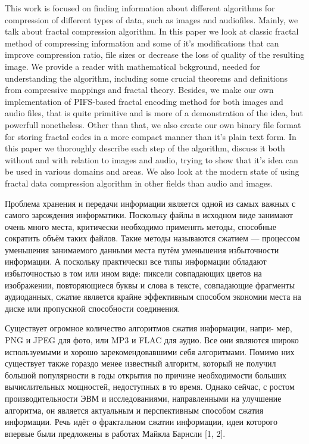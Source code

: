\documentclass[bachelor,paper]{pmk-graduate}
\theoremstyle{definition}
\begin{document}
\begin{englishabstract}
This work is focused on finding information about different algorithms for compression of different types of data, such as images and audiofiles. Mainly, we talk about fractal compression algorithm. In this paper we look at classic fractal method of compressing information and some of it's modifications that can improve compression ratio, file sizes or decrease the loss of quality of the resulting image. We provide a reader with mathematical bckground, needed for understanding the algorithm, including some crucial theorems and definitions from compressive mappings and fractal theory.
  Besides, we make our own implementation of PIFS-based fractal encoding method for both images and audio files, that is quite primitive and is more of a demonstration of the idea, but powerfull nonetheless. Other than that, we also create our own binary file format for storing fractal codes in a more compact manner than it's plain text form.
  In this paper we thoroughly describe each step of the algorithm, discuss it both without and with relation to images and audio, trying to show that it's idea can be used in various domains and areas. We also look at the modern state of using fractal data compression algorithm in other fields than audio and images.
\end{englishabstract}

\renewcommand{\thealgorithm}{\arabic{algorithm}.}

\maketitlepage
\introduction
\actuality
Проблема хранения и передачи информации является одной из самых важных с самого зарождения информатики. Поскольку файлы в исходном виде занимают очень много места, критически необходимо применять методы, способные сократить объём таких файлов. Такие методы называются сжатием --- процессом уменьшения занимаемого данными места путём уменьшения избыточности информации. А поскольку практически все типы информации обладают избыточностью в том или ином виде: пиксели совпадающих цветов на изображении, повторяющиеся буквы и слова в тексте, совпадающие фрагменты аудиоданных, сжатие является крайне эффективным способом экономии места на диске или пропускной способности соединения.

Существует огромное количество алгоритмов сжатия информации, напри-
мер, PNG и JPEG для фото, или MP3 и FLAC для аудио. Все они являются широко используемыми и хорошо зарекомендовавшими себя алгоритмами. Помимо них существует также гораздо менее известный алгоритм, который не получил большой популярности в годы открытия по причине необходимости больших вычислительных мощностей, недоступных в то время. Однако сейчас, с ростом производительности ЭВМ и исследованиями, направленными на улучшение алгоритма, он является актуальным и перспективным способом сжатия информации. Речь идёт о фрактальном сжатии информации, идеи которого впервые были предложены в работах Майкла Барнсли [1, 2].
\end{document}
